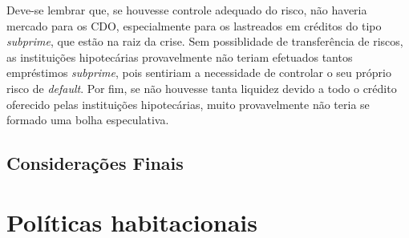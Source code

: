 \documentclass[
	12pt,				%
	oneside,			%
	a4paper,			%
	chapter=TITLE,		%
	section=TITLE,		%
	english,			%
	brazil				%
	]{abntex2}
\begin{document}
\begin{refsection}
Deve-se lembrar que, se houvesse controle adequado do risco, não haveria mercado
para os \gls{CDO}, especialmente para os lastreados em créditos do tipo
\emph{subprime}, que estão na raiz da crise. Sem possiblidade de transferência de
riscos, as instituições hipotecárias provavelmente não teriam efetuados tantos
empréstimos \emph{subprime}, pois sentiriam a necessidade de controlar o seu próprio
risco de \emph{default}. Por fim, se não houvesse tanta liquidez devido a todo o
crédito oferecido pelas instituições hipotecárias, muito provavelmente não teria
se formado uma bolha especulativa.

\hypertarget{considerauxe7uxf5es-finais-3}{%
\section{Considerações Finais}\label{considerauxe7uxf5es-finais-3}}

\printbibliography[heading=subbibintoc]
\end{refsection}
\hypertarget{politicas}{%
\chapter{Políticas habitacionais}\label{politicas}}
\end{document}
